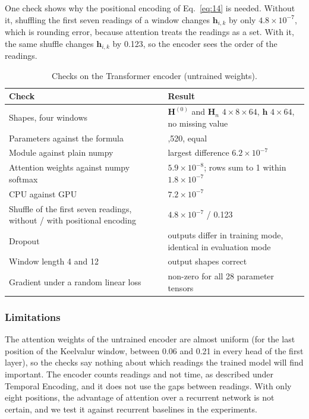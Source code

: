 \documentclass[conference]{IEEEtran}
\begin{document}
One check shows why the positional encoding of Eq.~\eqref{eq:14} is needed. Without it, shuffling the first seven readings of a window changes \(\mathbf{h}_{i,k}\) by only \(4.8 \times 10^{-7}\), which is rounding error, because attention treats the readings as a set. With it, the same shuffle changes \(\mathbf{h}_{i,k}\) by 0.123, so the encoder sees the order of the readings.

\begin{table}[!t]
\centering\footnotesize
\caption{Checks on the Transformer encoder (untrained weights).}\label{tab:15}
\begin{tabular}{>{\raggedright\arraybackslash}p{}>{\raggedright\arraybackslash}p{}}
\toprule
\textbf{Check} & \textbf{Result} \\
\midrule
Shapes, four windows & \(\mathbf{H}^{(0)}\) and \(\mathbf{H}_n\) \(4 \times 8 \times 64\), \(\mathbf{h}\) \(4 \times 64\), no missing value \\
Parameters against the formula & 67,520, equal \\
Module against plain numpy & largest difference \(6.2 \times 10^{-7}\) \\
Attention weights against numpy softmax & \(5.9 \times 10^{-8}\); rows sum to 1 within \(1.8 \times 10^{-7}\) \\
CPU against GPU & \(7.2 \times 10^{-7}\) \\
Shuffle of the first seven readings, without / with positional encoding & \(4.8 \times 10^{-7}\) / 0.123 \\
Dropout & outputs differ in training mode, identical in evaluation mode \\
Window length 4 and 12 & output shapes correct \\
Gradient under a random linear loss & non-zero for all 28 parameter tensors \\
\bottomrule
\end{tabular}
\end{table}

\subsubsection{Limitations}

The attention weights of the untrained encoder are almost uniform (for the last position of the Keelvalur window, between 0.06 and 0.21 in every head of the first layer), so the checks say nothing about which readings the trained model will find important. The encoder counts readings and not time, as described under Temporal Encoding, and it does not use the gaps between readings. With only eight positions, the advantage of attention over a recurrent network is not certain, and we test it against recurrent baselines in the experiments.
\end{document}

